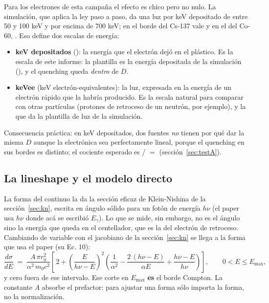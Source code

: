\documentclass[11pt,a4paper]{article}
\begin{document}
Para los electrones de esta campaña el efecto es chico pero no nulo. La
simulación, que aplica la ley paso a paso, da una luz por keV depositado de
\SimQfBajoCo{} entre 50 y 100 keV y \SimQfAltoCo{} por encima de 700 keV; en
el borde del Cs-137 vale \QuenchCs{} y en el del Co-60, \QuenchCo. Eso define
dos escalas de energía:

\begin{itemize}
\item \textbf{keV depositados} (\keVdep): la energía que el electrón dejó en
      el plástico. Es la escala de este informe: la plantilla es la energía
      depositada de la simulación (\texttt{\Rama}), y el quenching queda
      \emph{dentro} de $D$.
\item \textbf{keVee} (keV electrón-equivalentes): la luz, expresada en la
      energía de un electrón rápido que la habría producido. Es la escala
      natural para comparar con otras partículas (protones de retroceso de un
      neutrón, por ejemplo), y la que da la plantilla de luz de la
      simulación.
\end{itemize}

\noindent
Consecuencia práctica: en keV depositados, dos fuentes \emph{no} tienen por
qué dar la misma $D$ aunque la electrónica sea perfectamente lineal, porque
el quenching en sus bordes es distinto; el cociente esperado es
\QuenchCs/\QuenchCo{} $=$ \CocEsperado{} (sección~\ref{sec:testA}).

\subsection{La lineshape y el modelo directo}
\label{sec:lineshape}
\enpaper

La forma del continuo la da la sección eficaz de Klein-Nishina de la
sección~\ref{sec:kn}, escrita en ángulo sólido para un fotón de energía
$h\nu$ (el paper usa $h\nu$ donde acá se escribió $E_\gamma$).
Lo que se mide, sin embargo, no es el ángulo sino la energía que queda en el
centellador, que es la del electrón de retroceso. Cambiando de variable con el
jacobiano de la sección~\ref{sec:kn} se llega a la forma que usa el paper (su
Ec. 10):
\[
   \frac{d\sigma}{dE} \;=\; \frac{A\,\pi r_0^2}{\alpha^2\, m_0c^2}
   \left[\,2 + \left(\frac{E}{h\nu - E}\right)^{\!2}
   \left(\frac{1}{\alpha^2} - \frac{2\,(h\nu-E)}{\alpha E}
         + \frac{h\nu-E}{h\nu}\right)\right],
   \qquad 0 < E \le E_{\max},
\]
y cero fuera de ese intervalo. Ese corte en $E_{\max}$ \textbf{es} el borde
Compton. La constante $A$ absorbe el prefactor: para ajustar una forma sólo
importa la forma, no la normalización.
\end{document}
